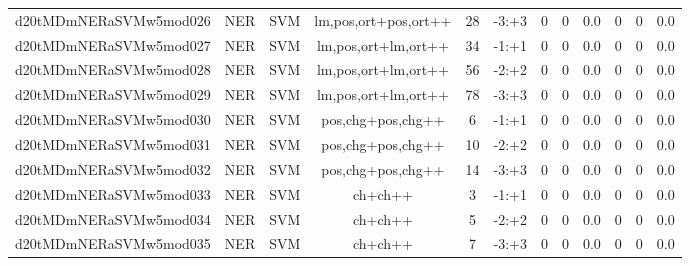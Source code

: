 \documentclass[a4paper]{article}
\begin{document}
\begin{landscape}
\begin{center}
\begin{tabular}{ |c|c|c|c|c|c|c|c|c|c|c|c|}
 
 	
 	\small{ d20tMDmNERaSVMw5mod026 } & \small{ NER} & \small{  SVM }  & lm,pos,ort+pos,ort++  &  28 &  \small{  -3:+3 }  &  0 & 0 & 0.0  &  0 & 0 & 0.0 \\
 	

 
 	
 	\small{ d20tMDmNERaSVMw5mod027 } & \small{ NER} & \small{  SVM }  & lm,pos,ort+lm,ort++  &  34 &  \small{  -1:+1 }  &  0 & 0 & 0.0  &  0 & 0 & 0.0 \\
 	

 
 	
 	\small{ d20tMDmNERaSVMw5mod028 } & \small{ NER} & \small{  SVM }  & lm,pos,ort+lm,ort++  &  56 &  \small{  -2:+2 }  &  0 & 0 & 0.0  &  0 & 0 & 0.0 \\
 	

 
 	
 	\small{ d20tMDmNERaSVMw5mod029 } & \small{ NER} & \small{  SVM }  & lm,pos,ort+lm,ort++  &  78 &  \small{  -3:+3 }  &  0 & 0 & 0.0  &  0 & 0 & 0.0 \\
 	

 
 	
 	\small{ d20tMDmNERaSVMw5mod030 } & \small{ NER} & \small{  SVM }  & pos,chg+pos,chg++  &  6 &  \small{  -1:+1 }  &  0 & 0 & 0.0  &  0 & 0 & 0.0 \\
 	

 
 	
 	\small{ d20tMDmNERaSVMw5mod031 } & \small{ NER} & \small{  SVM }  & pos,chg+pos,chg++  &  10 &  \small{  -2:+2 }  &  0 & 0 & 0.0  &  0 & 0 & 0.0 \\
 	

 
 	
 	\small{ d20tMDmNERaSVMw5mod032 } & \small{ NER} & \small{  SVM }  & pos,chg+pos,chg++  &  14 &  \small{  -3:+3 }  &  0 & 0 & 0.0  &  0 & 0 & 0.0 \\
 	

 
 	
 	\small{ d20tMDmNERaSVMw5mod033 } & \small{ NER} & \small{  SVM }  & ch+ch++  &  3 &  \small{  -1:+1 }  &  0 & 0 & 0.0  &  0 & 0 & 0.0 \\
 	

 
 	
 	\small{ d20tMDmNERaSVMw5mod034 } & \small{ NER} & \small{  SVM }  & ch+ch++  &  5 &  \small{  -2:+2 }  &  0 & 0 & 0.0  &  0 & 0 & 0.0 \\
 	

 
 	
 	\small{ d20tMDmNERaSVMw5mod035 } & \small{ NER} & \small{  SVM }  & ch+ch++  &  7 &  \small{  -3:+3 }  &  0 & 0 & 0.0  &  0 & 0 & 0.0 \\
 	


\end{tabular}
\end{center}
\end{landscape}
\end{document}
